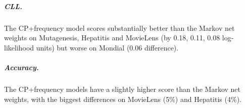\documentclass[twoside,leqno,twocolumn]{article}
\begin{document}
\subparagraph{CLL.}
The CP+frequency  model scores substantially better than the Markov net weights on Mutagenesis, Hepatitis and MovieLens (by 0.18, 0.11, 0.08 log-likelihood units) but worse on Mondial (0.06 difference). 


\subparagraph{Accuracy.} 
The CP+frequency models have a slightly higher score than the Markov net weights, with the biggest differences on MovieLens (5\%) and Hepatitis (4\%). 




%
%
%
\end{document}
